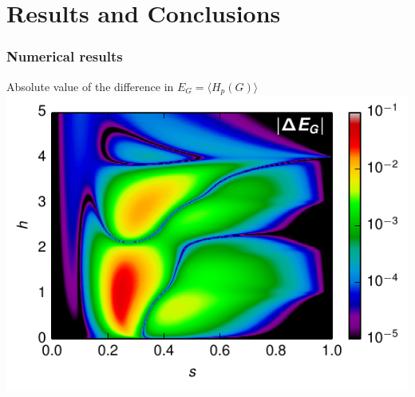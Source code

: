 \documentclass{beamer}
\newcommand{\ev}[1]{\langle #1 \rangle} %
\begin{document}
\section{Results and Conclusions}

\begin{frame}
  \frametitle{Numerical results}
  \begin{center}
    Absolute value of the difference in $E_G=\ev{H_p(G)}$
    \bigskip
    \includegraphics{delta-Eg-big}
  \end{center}
\end{frame}
\end{document}
